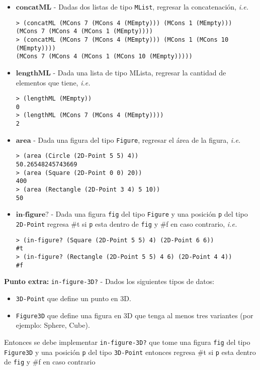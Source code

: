 \documentclass{article}
\begin{document}
\begin{itemize}
\item $\textbf{concatML}$ - Dadas dos listas de tipo \texttt{MList},
  regresar la concatenación, \textit{i.e.}
\begin{verbatim}
> (concatML (MCons 7 (MCons 4 (MEmpty))) (MCons 1 (MEmpty)))
(MCons 7 (MCons 4 (MCons 1 (MEmpty))))
> (concatML (MCons 7 (MCons 4 (MEmpty))) (MCons 1 (MCons 10 (MEmpty))))
(MCons 7 (MCons 4 (MCons 1 (MCons 10 (MEmpty)))))
\end{verbatim}

\item $\textbf{lengthML}$ - Dada una lista de tipo MLista, regresar la
  cantidad de elementos que tiene, \textit{i.e.}
\begin{verbatim}
> (lengthML (MEmpty))
0
> (lengthML (MCons 7 (MCons 4 (MEmpty))))
2
\end{verbatim}

\item $\textbf{area}$ - Dada una figura del tipo \texttt{Figure},
  regresar el área de la figura, \textit{i.e.}
\begin{verbatim}
> (area (Circle (2D-Point 5 5) 4))
50.26548245743669
> (area (Square (2D-Point 0 0) 20))
400
> (area (Rectangle (2D-Point 3 4) 5 10))
50
\end{verbatim}

\item $\textbf{in-figure?}$ - Dada una figura \texttt{fig} del tipo \texttt{Figure}
  y una posición \texttt{p} del tipo \texttt{2D-Point} regresa \#t si \texttt{p} esta
  dentro de \texttt{fig} y \#f en caso contrario, \textit{i.e.}
\begin{verbatim}
> (in-figure? (Square (2D-Point 5 5) 4) (2D-Point 6 6))
#t
> (in-figure? (Rectangle (2D-Point 5 5) 4 6) (2D-Point 4 4))
#f
\end{verbatim}

\end{itemize}

\textbf{Punto extra:} \texttt{in-figure-3D?} - Dados los siguientes tipos de datos:
\begin{itemize}
\item{ \texttt{3D-Point} que define un punto en 3D.}
\item{\texttt{Figure3D} que define una figura en 3D que tenga al menos tres variantes (por ejemplo: Sphere, Cube)}.
\end{itemize}
Entonces se debe implementar \texttt{in-figure-3D?} que tome una figura \texttt{fig} del tipo \texttt{Figure3D} y una posición \texttt{p} del tipo \texttt{3D-Point} entonces regresa \#t si \texttt{p} esta dentro de \texttt{fig} y \#f en caso contrario
\end{document}
